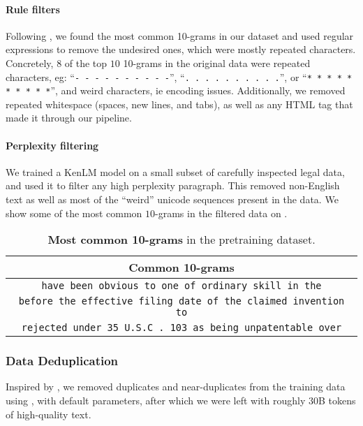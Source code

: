 \paragraph{Rule filters}
Following \citet{elazar2023whats}, we found the most common 10-grams in our dataset and used regular expressions to remove the undesired ones, which were mostly repeated characters. Concretely, $8$ of the top $10$ 10-grams in the original data were repeated characters, eg: ``\texttt{- - - - - - - - - -}'', ``\texttt{. . . . . . . . . .}'', or ``\texttt{* * * * * * * * * *}'', and weird characters, ie encoding issues. Additionally, we removed repeated whitespace (spaces, new lines, and tabs), as well as any HTML tag that made it through our pipeline.

\paragraph{Perplexity filtering}
We trained a KenLM model \citep{heafield-2011-kenlm} on a small subset of carefully inspected legal data, and used it to filter any high perplexity paragraph. This removed non-English text as well as most of the ``weird'' unicode sequences present in the data. We show some of the most common $10$-grams in the filtered data on .

\begin{table}[ht]
    \scriptsize
    \centering
    \begin{tabular}{c}
    \toprule              
    Common 10-grams \\
    \midrule
    \texttt{have been obvious to one of ordinary skill in the} \\
    \texttt{before the effective filing date of the claimed invention to} \\
    \texttt{rejected under 35 U.S.C . 103 as being unpatentable over} \\
    \bottomrule
    \end{tabular}
    \caption{\textbf{Most common 10-grams} in the pretraining dataset.}
    \label{tab:common-ngrams}
\end{table}

\subsubsection{Data Deduplication}
Inspired by \citet{kocetkov2023the,lee2021deduplicating}, we removed duplicates and near-duplicates from the training data using \citet{chenghao_mou_2023_8364980}, with default parameters, after which we were left with roughly $30$B tokens of high-quality text.


